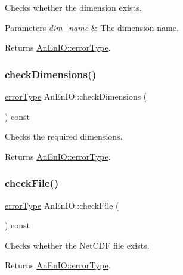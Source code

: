 Checks whether the dimension exists.


\begin{DoxyParams}{Parameters}
{\em dim\+\_\+name} & The dimension name. \\
\hline
\end{DoxyParams}
\begin{DoxyReturn}{Returns}
\mbox{\hyperlink{class_an_en_i_o_aa56bc1ec6610b86db4349bce20f9ead0}{An\+En\+I\+O\+::error\+Type}}. 
\end{DoxyReturn}
\mbox{\label{class_an_en_i_o_ab6cd06f6402655924002fec4f83195eb}} 
\subsubsection{\texorpdfstring{check\+Dimensions()}{checkDimensions()}}
{\footnotesize\ttfamily \mbox{\hyperlink{class_an_en_i_o_aa56bc1ec6610b86db4349bce20f9ead0}{error\+Type}} An\+En\+I\+O\+::check\+Dimensions (\begin{DoxyParamCaption}{ }\end{DoxyParamCaption}) const}

Checks the required dimensions. \begin{DoxyReturn}{Returns}
\mbox{\hyperlink{class_an_en_i_o_aa56bc1ec6610b86db4349bce20f9ead0}{An\+En\+I\+O\+::error\+Type}}. 
\end{DoxyReturn}
\mbox{\label{class_an_en_i_o_adf0b96d441687159e1d884273847d68e}} 
\subsubsection{\texorpdfstring{check\+File()}{checkFile()}}
{\footnotesize\ttfamily \mbox{\hyperlink{class_an_en_i_o_aa56bc1ec6610b86db4349bce20f9ead0}{error\+Type}} An\+En\+I\+O\+::check\+File (\begin{DoxyParamCaption}{ }\end{DoxyParamCaption}) const}

Checks whether the Net\+C\+DF file exists.

\begin{DoxyReturn}{Returns}
\mbox{\hyperlink{class_an_en_i_o_aa56bc1ec6610b86db4349bce20f9ead0}{An\+En\+I\+O\+::error\+Type}}. 
\end{DoxyReturn}
\mbox{\label{class_an_en_i_o_aa9b4700db58d0ef09af429d5d31ff55f}} 
